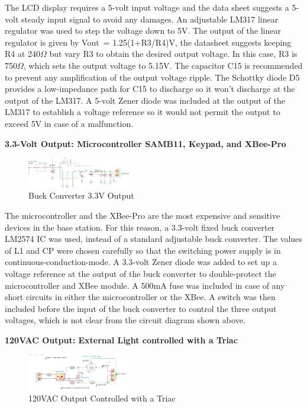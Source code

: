 \documentclass[journal,compsoc]{IEEEtran}
\begin{document}
The LCD display requires a 5-volt input voltage and the data sheet suggests a 5-volt steady input signal to avoid any damages.  An adjustable LM317 linear regulator was used to step the voltage down to 5V.  The output of the linear regulator is given by Vout~= 1.25(1+R3/R4)V, the datasheet suggests keeping R4 at 240$\Omega$ but vary R3 to obtain the desired output voltage.  In this case, R3 is 750$\Omega$, which sets the output voltage to 5.15V.  The capacitor C15 is recommended to prevent any amplification of the output voltage ripple.  The Schottky diode D5 provides a low-impedance path for C15 to discharge so it won’t discharge at the output of the LM317.  A 5-volt Zener diode was included at the output of the LM317 to establish a voltage reference so it would not permit the output to exceed 5V in case of a malfunction.


\textbf {3.3-Volt Output: Microcontroller SAMB11, Keypad, and XBee-Pro}

\begin{figure}[ht]	%
\centering
\includegraphics[width=0.4\textwidth]{Buck.png}
\caption{ Buck Converter 3.3V Output }
\label{PConverter}
\end{figure}

The microcontroller and the XBee-Pro are the most expensive and sensitive devices in the base station. For this reason, a 3.3-volt fixed buck converter LM2574 IC was used, instead of a standard adjustable buck converter.  The values of L1 and CP were chosen carefully so that the switching power supply is in continuous-conduction-mode.  A 3.3-volt Zener diode was added to set up a voltage reference at the output of the buck converter to double-protect the microcontroller and XBee module.  A 500mA fuse was included in case of any short circuits in either the microcontroller or the XBee.  A switch was then included before the input of the buck converter to control the three output voltages, which is not clear from the circuit diagram shown above.

\textbf {120VAC Output: External Light controlled with a Triac}

\begin{figure}[ht]	%
\centering
\includegraphics[width=0.4\textwidth]{Triac.png}
\caption{ 120VAC Output Controlled with a Triac}
\label{PTriac}
\end{figure}
\end{document}
